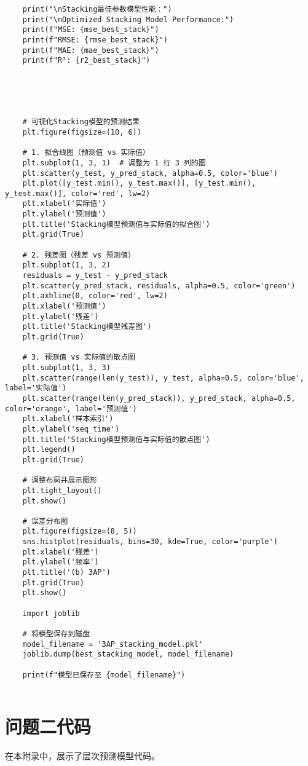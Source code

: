 \documentclass[bwprint]{gmcmthesis}
\begin{document}
\begin{lstlisting}
	print("\nStacking最佳参数模型性能：")
	print("\nOptimized Stacking Model Performance:")
	print(f"MSE: {mse_best_stack}")
	print(f"RMSE: {rmse_best_stack}")
	print(f"MAE: {mae_best_stack}")
	print(f"R²: {r2_best_stack}")
	
	
	
	
	
	# 可视化Stacking模型的预测结果
	plt.figure(figsize=(10, 6))
	
	# 1. 拟合线图（预测值 vs 实际值）
	plt.subplot(1, 3, 1)  # 调整为 1 行 3 列的图
	plt.scatter(y_test, y_pred_stack, alpha=0.5, color='blue')
	plt.plot([y_test.min(), y_test.max()], [y_test.min(), y_test.max()], color='red', lw=2)
	plt.xlabel('实际值')
	plt.ylabel('预测值')
	plt.title('Stacking模型预测值与实际值的拟合图')
	plt.grid(True)
	
	# 2. 残差图（残差 vs 预测值）
	plt.subplot(1, 3, 2)
	residuals = y_test - y_pred_stack
	plt.scatter(y_pred_stack, residuals, alpha=0.5, color='green')
	plt.axhline(0, color='red', lw=2)
	plt.xlabel('预测值')
	plt.ylabel('残差')
	plt.title('Stacking模型残差图')
	plt.grid(True)
	
	# 3. 预测值 vs 实际值的散点图
	plt.subplot(1, 3, 3)
	plt.scatter(range(len(y_test)), y_test, alpha=0.5, color='blue', label='实际值')
	plt.scatter(range(len(y_pred_stack)), y_pred_stack, alpha=0.5, color='orange', label='预测值')
	plt.xlabel('样本索引')
	plt.ylabel('seq_time')
	plt.title('Stacking模型预测值与实际值的散点图')
	plt.legend()
	plt.grid(True)
	
	# 调整布局并展示图形
	plt.tight_layout()
	plt.show()
	
	# 误差分布图
	plt.figure(figsize=(8, 5))
	sns.histplot(residuals, bins=30, kde=True, color='purple')
	plt.xlabel('残差')
	plt.ylabel('频率')
	plt.title('(b) 3AP')
	plt.grid(True)
	plt.show()
	
	import joblib
	
	# 将模型保存到磁盘
	model_filename = '3AP_stacking_model.pkl'
	joblib.dump(best_stacking_model, model_filename)
	
	print(f"模型已保存至 {model_filename}")
	
\end{lstlisting}




\section{问题二代码}
\noindent 在本附录中，展示了层次预测模型代码。
\end{document}

